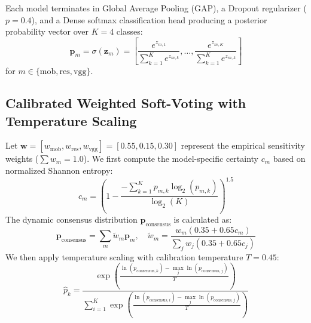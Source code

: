 \documentclass[runningheads]{llncs}
\begin{document}
Each model terminates in Global Average Pooling (GAP), a Dropout regularizer ($p=0.4$), and a Dense softmax classification head producing a posterior probability vector over $K=4$ classes:
\begin{equation}
\mathbf{p}_m = \sigma(\mathbf{z}_m) = \left[ \frac{e^{z_{m, 1}}}{\sum_{k=1}^K e^{z_{m, k}}}, \dots, \frac{e^{z_{m, K}}}{\sum_{k=1}^K e^{z_{m, k}}} \right]
\end{equation}
for $m \in \{\text{mob}, \text{res}, \text{vgg}\}$.

\subsection{Calibrated Weighted Soft-Voting with Temperature Scaling}
Let $\mathbf{w} = [w_{\text{mob}}, w_{\text{res}}, w_{\text{vgg}}] = [0.55, 0.15, 0.30]$ represent the empirical sensitivity weights ($\sum w_m = 1.0$). We first compute the model-specific certainty $c_m$ based on normalized Shannon entropy:
\begin{equation}
c_m = \left( 1 - \frac{-\sum_{k=1}^K p_{m, k} \log_2(p_{m, k})}{\log_2(K)} \right)^{1.5}
\end{equation}
The dynamic consensus distribution $\mathbf{p}_{\text{consensus}}$ is calculated as:
\begin{equation}
\mathbf{p}_{\text{consensus}} = \sum_{m} \tilde{w}_m \mathbf{p}_m, \quad \tilde{w}_m = \frac{w_m (0.35 + 0.65 c_m)}{\sum_j w_j (0.35 + 0.65 c_j)}
\end{equation}
We then apply temperature scaling with calibration temperature $T = 0.45$:
\begin{equation}
\hat{p}_k = \frac{\exp\left(\frac{\ln(p_{\text{consensus}, k}) - \max_j \ln(p_{\text{consensus}, j})}{T}\right)}{\sum_{i=1}^K \exp\left(\frac{\ln(p_{\text{consensus}, i}) - \max_j \ln(p_{\text{consensus}, j})}{T}\right)}
\end{equation}
\end{document}

